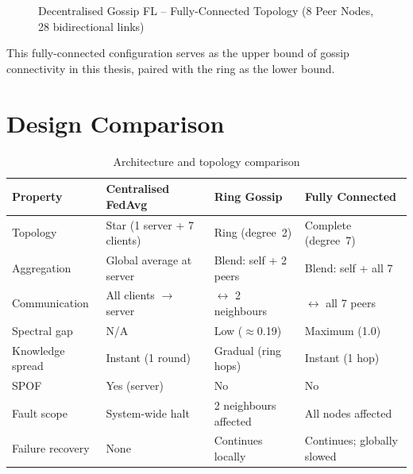 \documentclass[12pt]{report}
\begin{document}
\begin{figure}[ht]
\centering
{}
\caption{Decentralised Gossip FL -- Fully-Connected Topology (8 Peer Nodes, 28 bidirectional links)}
\label{fig:fc-arch}
\end{figure}

This fully-connected configuration serves as the upper bound of gossip
connectivity in this thesis, paired with the ring as the lower bound.

\section{Design Comparison}

\begin{table}[ht]
\centering
\begin{tabular}{llll}
\toprule
\textbf{Property} & \textbf{Centralised FedAvg} & \textbf{Ring Gossip} & \textbf{Fully Connected} \\
\midrule
Topology          & Star (1 server + 7 clients) & Ring (degree~2)       & Complete (degree~7) \\
Aggregation       & Global average at server    & Blend: self + 2 peers & Blend: self + all 7 \\
Communication     & All clients $\to$ server    & $\leftrightarrow$ 2 neighbours & $\leftrightarrow$ all 7 peers \\
Spectral gap      & N/A                         & Low ($\approx$0.19)   & Maximum (1.0) \\
Knowledge spread  & Instant (1 round)           & Gradual (ring hops)   & Instant (1 hop) \\
SPOF              & Yes (server)                & No                    & No \\
Fault scope       & System-wide halt            & 2 neighbours affected & All nodes affected \\
Failure recovery  & None                        & Continues locally     & Continues; globally slowed \\
\bottomrule
\end{tabular}
\vspace{0.5cm}
\caption{Architecture and topology comparison}
\label{tab:design-comparison}
\end{table}
\end{document}
